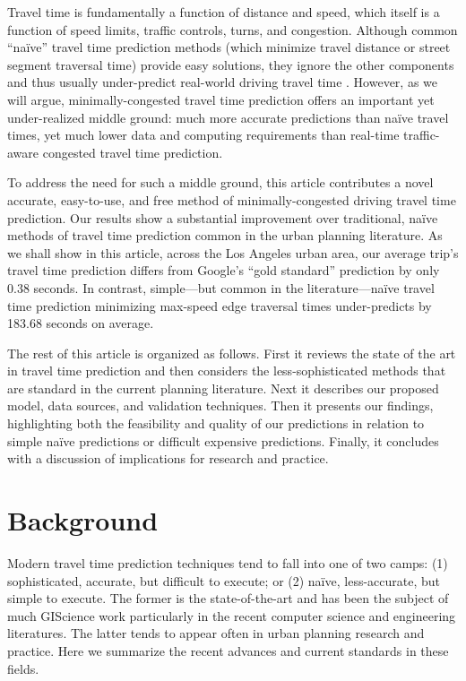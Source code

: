 \documentclass[12pt,letterpaper]{article} %
\begin{document}
Travel time is fundamentally a function of distance and speed, which itself is a function of speed limits, traffic controls, turns, and congestion. Although common \enquote{naïve} travel time prediction methods (which minimize travel distance or street segment traversal time) provide easy solutions, they ignore the other components and thus usually under-predict real-world driving travel time \citep{ludwig2023traffic,salonen2013modelling,yiannakoulias2013estimating}. However, as we will argue, minimally-congested travel time prediction offers an important yet under-realized middle ground: much more accurate predictions than naïve travel times, yet much lower data and computing requirements than real-time traffic-aware congested travel time prediction.

To address the need for such a middle ground, this article contributes a novel accurate, easy-to-use, and free method of minimally-congested driving travel time prediction. Our results show a substantial improvement over traditional, naïve methods of travel time prediction common in the urban planning literature. As we shall show in this article, across the Los Angeles urban area, our average trip's travel time prediction differs from Google's \enquote{gold standard} prediction by only 0.38 seconds. In contrast, simple---but common in the literature---naïve travel time prediction minimizing max-speed edge traversal times under-predicts by 183.68 seconds on average.

The rest of this article is organized as follows. First it reviews the state of the art in travel time prediction and then considers the less-sophisticated methods that are standard in the current planning literature. Next it describes our proposed model, data sources, and validation techniques. Then it presents our findings, highlighting both the feasibility and quality of our predictions in relation to simple naïve predictions or difficult expensive predictions. Finally, it concludes with a discussion of implications for research and practice.

\section{Background}

Modern travel time prediction techniques tend to fall into one of two camps: (1) sophisticated, accurate, but difficult to execute; or (2) naïve, less-accurate, but simple to execute. The former is the state-of-the-art and has been the subject of much GIScience work particularly in the recent computer science and engineering literatures. The latter tends to appear often in urban planning research and practice. Here we summarize the recent advances and current standards in these fields.
\end{document}
